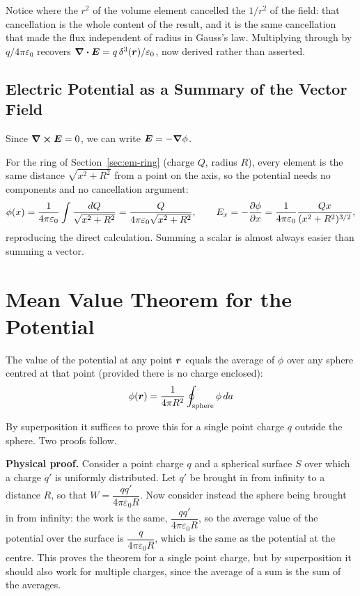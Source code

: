 Notice where the $r^2$ of the volume element cancelled the $1/r^2$ of the field: that cancellation is the whole content of the result, and it is the same cancellation that made the flux independent of radius in Gauss's law. Multiplying through by $q/4\pi\varepsilon_0$ recovers $\div\vect{E} = q\,\delta^3(\lvect{r})/\varepsilon_0$, now derived rather than asserted.

\subsection{Electric Potential as a Summary of the Vector Field}

Since $\curl\vect{E} = 0$, we can write $\vect{E} = -\grad\phi$.

\begin{example}
For the ring of Section~\ref{sec:em-ring} (charge $Q$, radius $R$), every element is the same distance $\sqrt{x^2+R^2}$ from a point on the axis, so the potential needs no components and no cancellation argument:
\[
    \phi(x) = \frac{1}{4\pi\varepsilon_0}\int\frac{dQ}{\sqrt{x^2+R^2}} = \frac{Q}{4\pi\varepsilon_0\sqrt{x^2+R^2}},
    \qquad
    E_x = -\pdv{\phi}{x} = \frac{1}{4\pi\varepsilon_0}\frac{Qx}{(x^2+R^2)^{3/2}},
\]
reproducing the direct calculation. Summing a scalar is almost always easier than summing a vector.
\end{example}

\section{Mean Value Theorem for the Potential}
\label{sec:em-meanvalue}

\begin{theorem}
The value of the potential at any point $\bm{r}$ equals the average of $\phi$ over any sphere centred at that point (provided there is no charge enclosed):
\[
    \phi(\bm{r}) = \frac{1}{4\pi R^2}\oint_{\text{sphere}} \phi\,da
\]
\end{theorem}

By superposition it suffices to prove this for a single point charge $q$ outside the sphere. Two proofs follow.

\textbf{Physical proof.} Consider a point charge $q$ and a spherical surface $S$ over which a charge $q'$ is uniformly distributed.
Let $q'$ be brought in from infinity to a distance $R$, so that $W = \dfrac{qq'}{4\pi\varepsilon_0 R}$. Now consider instead the sphere being brought in from infinity: the work is the same, $\dfrac{qq'}{4\pi\varepsilon_0 R}$, so the average value of the potential over the surface is $\dfrac{q}{4\pi\varepsilon_0 R}$, which is the same as the potential at the centre. This proves the theorem for a single point charge, but by superposition it should also work for multiple charges, since the average of a sum is the sum of the averages.


